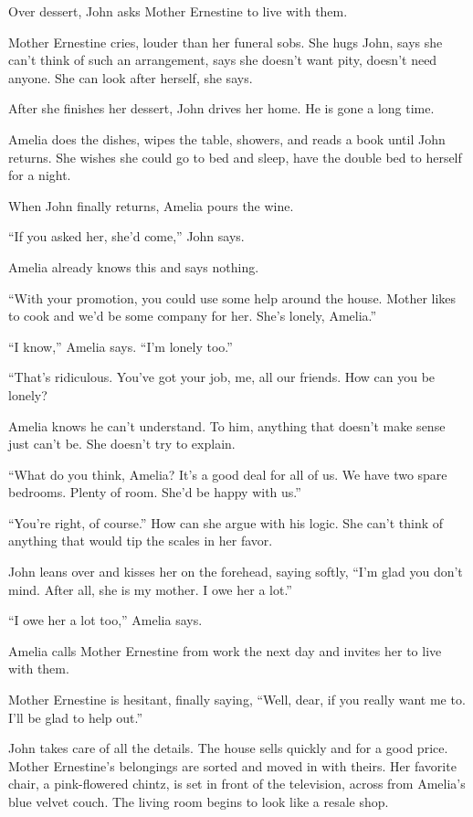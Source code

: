 \documentclass[twoside,10pt]{book}
\begin{document}
Over dessert, John asks Mother Ernestine to live with them.

Mother Ernestine cries, louder than her funeral sobs. She hugs John,
says she can't think of such an arrangement, says she doesn't want pity,
doesn't need anyone. She can look after herself, she says.

After she finishes her dessert, John drives her home. He is gone a long
time.

Amelia does the dishes, wipes the table, showers, and reads a book until
John returns. She wishes she could go to bed and sleep, have the double
bed to herself for a night.

When John finally returns, Amelia pours the wine.

``If you asked her, she'd come,'' John says.

Amelia already knows this and says nothing.

``With your promotion, you could use some help around the house. Mother
likes to cook and we'd be some company for her. She's lonely, Amelia.''

``I know,'' Amelia says. ``I'm lonely too.''

``That's ridiculous. You've got your job, me, all our friends. How can
you be lonely?

Amelia knows he can't understand. To him, anything that doesn't make
sense just can't be. She doesn't try to explain.

``What do you think, Amelia? It's a good deal for all of us. We have two
spare bedrooms. Plenty of room. She'd be happy with us.''

``You're right, of course.'' How can she argue with his logic. She can't
think of anything that would tip the scales in her favor.

John leans over and kisses her on the forehead, saying softly, ``I'm
glad you don't mind. After all, she is my mother. I owe her a lot.''

``I owe her a lot too,'' Amelia says.

Amelia calls Mother Ernestine from work the next day and invites her to
live with them.

Mother Ernestine is hesitant, finally saying, ``Well, dear, if you
really want me to. I'll be glad to help out.''

John takes care of all the details. The house sells quickly and for a
good price. Mother Ernes­tine's belongings are sorted and moved in with
theirs. Her favorite chair, a pink-flowered chintz, is set in front of
the television, across from Amelia's blue velvet couch. The living room
begins to look like a resale shop.
\end{document}
